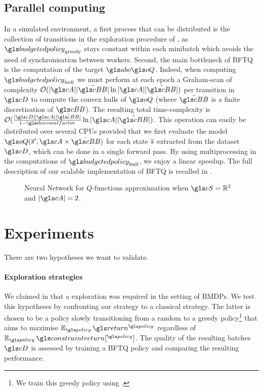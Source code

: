 \subsection{Parallel computing}
\label{subsec:parallel-computing}
In a simulated environment, a first process that can be distributed is the collection of transitions in the exploration procedure of , as $\budgetedpolicy_\text{greedy}$ stays constant within each minibatch which avoids the need of synchronisation between workers. Second, the main bottleneck of \gls{BFTQ} is the computation of the target $\abo \oQ$. Indeed, when computing $\budgetedpolicy_\text{hull}$ we must perform at each epoch a Graham-scan of complexity $\cO(|\cA||\tilde{\budgetspace}| \log |\cA||\tilde{\budgetspace}|)$ per transition in $\cD$ to compute the convex hulls of $\oQ$ (where $\tilde{\budgetspace}$ is a finite discretisation of $\budgetspace$). The resulting total time-complexity is $\cO(\frac{|\cD||\cA||\tilde{\budgetspace}|}{1-\discountfactor} \log |\cA||\tilde{\budgetspace}|)$. This operation can easily be distributed over several CPUs provided that we first evaluate the model $\oQ(\os',\cA \times \tilde{\budgetspace})$ for each state $\overline{s}$ extracted from the dataset $\cD$, which can be done in a single forward pass. By using multiprocessing in the computations of $\budgetedpolicy_\text{hull}$, we enjoy a linear speedup.
The full description of our scalable implementation of \gls{BFTQ} is recalled in .


\begin{figure}[tp]
	\centering
	
	\caption{Neural Network for $Q$-functions approximation when $\cS=\Real^2$ and $|\cA| = 2$.}
	\label{fig:bftq-architecture}
\end{figure}




\section{Experiments}
\label{sec:brl-experiments}
There are two hypotheses we want to validate.

\paragraph{Exploration strategies} We claimed in  that a  exploration was required in the setting of \glspl{BMDP}. We test this hypotheses by confronting our strategy to a classical  strategy. The latter is chosen to be a  policy slowly transitioning from a random to a greedy policy\footnote{We train this greedy policy using \FTQ.} that aims to maximise $\expectedvalue_{\policy} \return^{\policy}$ regardless of $\expectedvalue_{\policy} \constraintreturn[^{\policy}]$. The quality of the resulting batches $\cD$ is assessed by training a \gls{BFTQ} policy and comparing the resulting performance.

